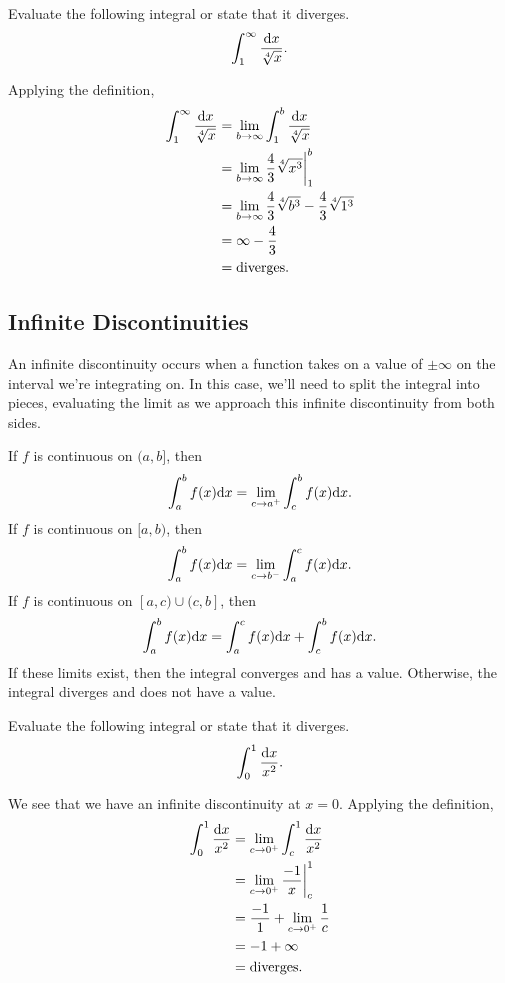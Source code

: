 \begin{example}
	Evaluate the following integral or state that it diverges.
	\begin{equation*}
		\int_{1}^{\infty}{\frac{\mathrm{d} x}{\sqrt[4]{x}}}.
	\end{equation*}
\end{example}
Applying the definition,
\begin{align*}
	\int_{1}^{\infty}{\frac{\mathrm{d} x}{\sqrt[4]{x}}} &= \lim_{b\to\infty}{\int_{1}^{b}{\frac{\mathrm{d} x}{\sqrt[4]{x}}}} \\
	&= \lim_{b\to\infty}{\frac{4}{3}\sqrt[4]{x^3}\biggr\rvert_{1}^{b}} \\
	&= \lim_{b\to\infty}{\frac{4}{3}\sqrt[4]{b^3}} - \frac{4}{3}\sqrt[4]{1^3} \\
	&= \infty - \frac{4}{3} \\
	&= \text{diverges}.
\end{align*}

\subsection{Infinite Discontinuities}
An infinite discontinuity occurs when a function takes on a value of $\pm\infty$ on the interval we're integrating on.
In this case, we'll need to split the integral into pieces, evaluating the limit as we approach this infinite discontinuity from both sides.
\begin{definition}
	If $f$ is continuous on $(a,b]$, then
	\begin{equation*}
		\int_{a}^{b}{f(x)\mathrm{d} x} = \lim_{c\to a^+}{\int_{c}^{b}{f(x)\mathrm{d} x}}.
	\end{equation*}
	If $f$ is continuous on $[a,b)$, then
	\begin{equation*}
		\int_{a}^{b}{f(x)\mathrm{d} x} = \lim_{c\to b^-}{\int_{a}^{c}{f(x)\mathrm{d} x}}.
	\end{equation*}
	If $f$ is continuous on $[a,c) \cup (c,b]$, then
	\begin{equation*}
		\int_{a}^{b}{f(x)\mathrm{d} x} = \int_{a}^{c}{f(x)\mathrm{d} x} + \int_{c}^{b}{f(x)\mathrm{d} x}.
	\end{equation*}
	If these limits exist, then the integral converges and has a value.
	Otherwise, the integral diverges and does not have a value.
\end{definition}

\begin{example}
	Evaluate the following integral or state that it diverges.
	\begin{equation*}
		\int_{0}^{1}{\frac{\mathrm{d} x}{x^2}}.
	\end{equation*}
\end{example}
We see that we have an infinite discontinuity at $x=0$.
Applying the definition,
\begin{align*}
	\int_{0}^{1}{\frac{\mathrm{d} x}{x^2}} &= \lim_{c\to 0^+}{\int_{c}^{1}{\frac{\mathrm{d} x}{x^2}}} \\
	&= \lim_{c\to 0^+}{\frac{-1}{x}\biggr\rvert_{c}^{1}} \\
	&= \frac{-1}{1} + \lim_{c\to 0^+}{\frac{1}{c}} \\
	&= -1 + \infty \\
	&= \text{diverges}.
\end{align*}

